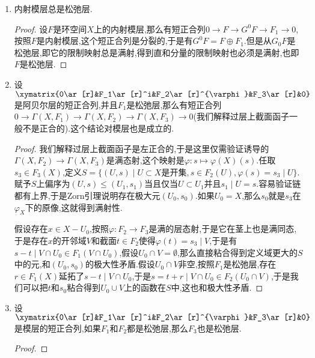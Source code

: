 \begin{enumerate}
\begin{proof}
		于是有如下短正合列之间的交换图表:
		$$\xymatrix{0\ar[r]&\mathrm{coker}d^{i-1}_{F_1}\ar[r]\ar[d]_{d^{i}_{F_1}}&\mathrm{coker}d^{i-1}_{F_2}\ar[r]\ar[d]_{d^{i}_{F_2}}&\mathrm{coker}d^{i-1}_{F_1}\ar[r]\ar[d]_{d^{i}_{F_3}}&0\\0\ar[r]&G^{i+1}F_1\ar[r]&G^{i+1}F_2\ar[r]&G^{i+1}F_3\ar[r]&0}$$
		
		垂直态射都是单的,按照蛇形引理就得到如下短正合列,这完成归纳.
		$$\xymatrix{0\ar[r]&\mathrm{coker}d^{i}_{F_1}\ar[r]&\mathrm{coker}d^{i}_{F_2}\ar[r]&\mathrm{coker}d^{i}_{F_3}\ar[r]&0}$$
	\end{proof}
	\item 内射模层总是松弛层.
	\begin{proof}
		
		设$F$是环空间$X$上的内射模层,那么有短正合列$0\to F\to G^0F\to F_1\to0$,按照$F$是内射模层,这个短正合列是分裂的,于是有$G^0F=F\oplus F_1$.但是从$G_0F$是松弛层,即它的限制映射总是满射,得到直和分量的限制映射也必须是满射,也即$F$是松弛层.
	\end{proof}
	\item 设$\xymatrix{0\ar[r]&F_1\ar[r]^i&F_2\ar[r]^{\varphi}&F_3\ar[r]&0}$是阿贝尔层的短正合列,并且$F_1$是松弛层,那么有短正合列$0\to\Gamma(X,F_1)\to\Gamma(X,F_2)\to\Gamma(X,F_3)\to0$(我们解释过层上截面函子一般不是正合的).这个结论对模层也是成立的.
	\begin{proof}
		
		我们解释过层上截面函子是左正合的,于是这里仅需验证诱导的$\Gamma(X,F_2)\to\Gamma(X,F_3)$是满态射,这个映射是$\varphi:s\mapsto\varphi(X)(s)$.任取$s_3\in F_3(X)$,定义$S=\{(U,s)\mid U\subset X\text{是开集},s\in F_2(U),\varphi(s)=s_3\mid U\}$.赋予$S$上偏序为$(U,s)\le(U_1,s_1)$当且仅当$U\subset U_1$并且$s_1\mid U=s$.容易验证链都有上界,于是Zorn引理说明存在极大元$(U_0,s_0)$.如果$U_0=X$,那么$s_0$就是$s_3$在$\varphi_X$下的原像,这就得到满射性.
		
		\qquad
		
		假设存在$x\in X-U_0$,按照$\varphi:F_2\to F_3$是满的层态射,于是它在茎上也是满同态,于是存在$x$的开邻域$V$和截面$t\in F_2$使得$\varphi(t)=s_3\mid V$,于是有$s-t\mid V\cap U_0\in F_1(V\cap U_0)$,假设$U_0\cap V=\emptyset$,那么直接粘合得到定义域更大的$S$中的元,和$(U_0,s_0)$的极大性矛盾.假设$U_0\cap V$非空,按照$F_1$是松弛层,存在$r\in F_1(X)$延拓了$s-t\mid V\cap U_0$,于是$s=t+r\mid V\cap U_0\in F_2(U_0\cap V)$,于是我们可以把$t$和$s_0$粘合得到$U_0\cup V$上的函数在$S$中,这也和极大性矛盾.
	\end{proof}
	\item 设$\xymatrix{0\ar[r]&F_1\ar[r]^i&F_2\ar[r]^{\varphi}&F_3\ar[r]&0}$是模层的短正合列,如果$F_1$和$F_2$都是松弛层,那么$F_3$也是松弛层.
	\begin{proof}
		

\end{proof}
\end{enumerate}
